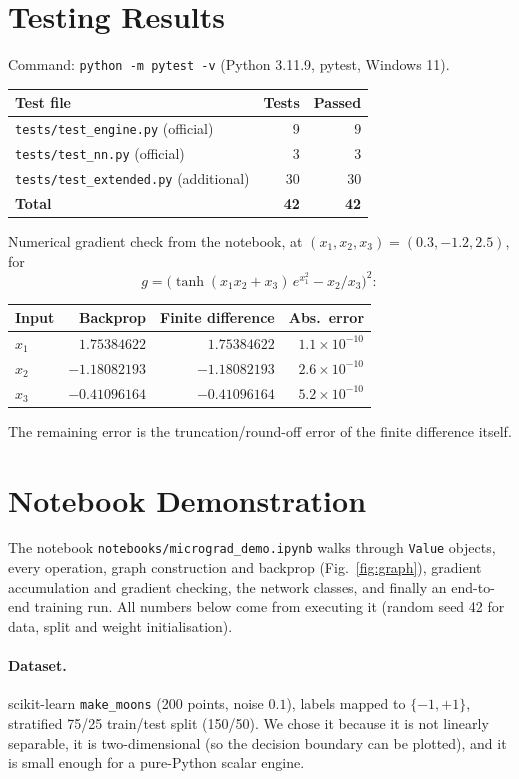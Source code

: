 \documentclass[11pt,a4paper]{article}
\begin{document}
\section{Testing Results}
Command: \texttt{python -m pytest -v} (Python 3.11.9, pytest, Windows 11).
\begin{center}
\begin{tabular}{lrr}
\toprule
Test file & Tests & Passed \\
\midrule
\texttt{tests/test\_engine.py} (official) & 9 & 9 \\
\texttt{tests/test\_nn.py} (official) & 3 & 3 \\
\texttt{tests/test\_extended.py} (additional) & 30 & 30 \\
\midrule
\textbf{Total} & \textbf{42} & \textbf{42} \\
\bottomrule
\end{tabular}
\end{center}
Numerical gradient check from the notebook, at $(x_1,x_2,x_3)=(0.3,-1.2,2.5)$, for
\[
g = \big(\tanh(x_1x_2 + x_3)\,e^{x_1^2} - x_2/x_3\big)^2 :
\]
\begin{center}
\begin{tabular}{lrrr}
\toprule
Input & Backprop & Finite difference & Abs.\ error \\
\midrule
$x_1$ & $1.75384622$ & $1.75384622$ & $1.1\times10^{-10}$ \\
$x_2$ & $-1.18082193$ & $-1.18082193$ & $2.6\times10^{-10}$ \\
$x_3$ & $-0.41096164$ & $-0.41096164$ & $5.2\times10^{-10}$ \\
\bottomrule
\end{tabular}
\end{center}
The remaining error is the truncation/round-off error of the finite difference itself.

\section{Notebook Demonstration}
The notebook \texttt{notebooks/micrograd\_demo.ipynb} walks through \texttt{Value} objects, every operation,
graph construction and backprop (Fig.~\ref{fig:graph}), gradient accumulation and gradient checking, the
network classes, and finally an end-to-end training run. All numbers below come from executing it
(random seed 42 for data, split and weight initialisation).

\paragraph{Dataset.} scikit-learn \texttt{make\_moons} (200 points, noise $0.1$), labels mapped to
$\{-1,+1\}$, stratified 75/25 train/test split (150/50). We chose it because it is not linearly separable,
it is two-dimensional (so the decision boundary can be plotted), and it is small enough for a pure-Python
scalar engine.
\end{document}
